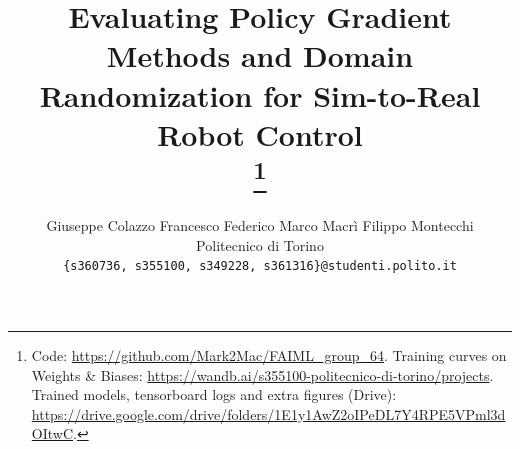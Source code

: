 \documentclass[10pt,twocolumn,letterpaper]{article}
\title{Evaluating Policy Gradient Methods and Domain Randomization for Sim-to-Real Robot Control\\
\thanks{Code: \url{https://github.com/Mark2Mac/FAIML_group_64}. Training curves on Weights \& Biases: \url{https://wandb.ai/s355100-politecnico-di-torino/projects}. Trained models, tensorboard logs and extra figures (Drive): \url{https://drive.google.com/drive/folders/1E1y1AwZ2oIPeDL7Y4RPE5VPml3dOItwC}.}}
\author{Giuseppe Colazzo \quad Francesco Federico \quad Marco Macrì \quad Filippo Montecchi \\
Politecnico di Torino\\
{\tt\small \{s360736, s355100, s349228, s361316\}@studenti.polito.it}
}
\begin{document}
\maketitle















{
    \small
    
    
}

% 
\end{document}
